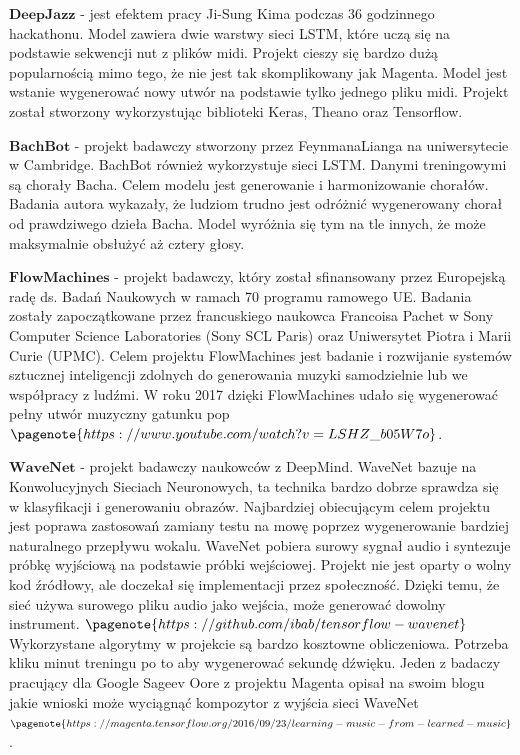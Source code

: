  $\textbf{DeepJazz}$ - jest efektem pracy Ji-Sung Kima podczas 36 godzinnego hackathonu. Model zawiera dwie warstwy sieci LSTM, które uczą się na podstawie sekwencji nut z plików midi. Projekt cieszy się bardzo dużą popularnością mimo tego, że nie jest tak skomplikowany jak Magenta. Model jest wstanie wygenerować nowy utwór na podstawie tylko jednego pliku midi. Projekt został stworzony wykorzystując biblioteki Keras, Theano oraz Tensorflow.
 
 $\textbf{BachBot}$ - projekt badawczy stworzony przez FeynmanaLianga na uniwersytecie w Cambridge. BachBot również wykorzystuje sieci LSTM. Danymi treningowymi są chorały Bacha. Celem modelu jest generowanie i harmonizowanie chorałów. Badania autora wykazały, że ludziom trudno jest odróżnić wygenerowany chorał od prawdziwego dzieła Bacha. Model wyróżnia się tym na tle innych, że może maksymalnie obsłużyć aż cztery głosy.
 
 $\textbf{FlowMachines}$ - projekt badawczy, który został sfinansowany przez Europejską radę ds. Badań Naukowych w ramach 70 programu ramowego UE. Badania zostały zapoczątkowane przez francuskiego naukowca Francoisa Pachet w Sony Computer Science Laboratories (Sony SCL Paris) oraz Uniwersytet Piotra i Marii Curie (UPMC). Celem projektu FlowMachines jest badanie i rozwijanie systemów sztucznej inteligencji zdolnych do generowania muzyki samodzielnie lub we współpracy z ludźmi. W roku 2017 dzięki FlowMachines udało się wygenerować pełny utwór muzyczny gatunku pop$\pagenote{https://www.youtube.com/watch?v=LSHZ\_b05W7o}$. 
 
 $\textbf{WaveNet}$ - projekt badawczy naukowców z DeepMind. WaveNet bazuje na Konwolucyjnych Sieciach Neuronowych, ta technika bardzo dobrze sprawdza się w klasyfikacji i generowaniu obrazów. Najbardziej obiecującym celem projektu jest poprawa zastosowań zamiany testu na mowę poprzez wygenerowanie bardziej naturalnego przepływu wokalu. WaveNet pobiera surowy sygnał audio i syntezuje próbkę wyjściową na podstawie próbki wejściowej. Projekt nie jest oparty o wolny kod źródłowy, ale doczekał się implementacji przez społeczność. Dzięki temu, że sieć używa surowego pliku audio jako wejścia, może generować dowolny instrument. $\pagenote{https://github.com/ibab/tensorflow-wavenet}$ Wykorzystane algorytmy w projekcie są bardzo kosztowne obliczeniowa. Potrzeba kliku minut treningu po to aby wygenerować sekundę dźwięku. Jeden z badaczy pracujący dla Google Sageev Oore z projektu Magenta opisał na swoim blogu jakie wnioski może wyciągnąć kompozytor z wyjścia sieci WaveNet$\pagenote{https://magenta.tensorflow.org/2016/09/23/learning-music-from-learned-music}$.
 
